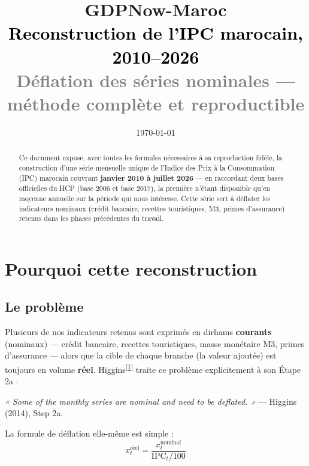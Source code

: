 \documentclass[11pt,a4paper]{article}
\title{\vspace{-1.3cm}\textcolor{bleuprincip}{\Huge\bfseries GDPNow-Maroc}\\[0.3cm]
\textcolor{black}{\Large Reconstruction de l'IPC marocain, 2010--2026}\\[0.15cm]
\textcolor{gray}{\large Déflation des séries nominales --- méthode complète et reproductible}}
\author{}
\date{\today}
\newcommand{\cit}[1]{\textsuperscript{\hyperlink{ref#1}{[#1]}}}
\begin{document}
\maketitle
\thispagestyle{empty}

\begin{abstract}
\noindent Ce document expose, avec toutes les formules nécessaires à sa reproduction fidèle, la construction d'une série mensuelle unique de l'Indice des Prix à la Consommation (IPC) marocain couvrant \textbf{janvier 2010 à juillet 2026} --- en raccordant deux bases officielles du HCP (base 2006 et base 2017), la première n'étant disponible qu'en moyenne annuelle sur la période qui nous intéresse. Cette série sert à déflater les indicateurs nominaux (crédit bancaire, recettes touristiques, M3, primes d'assurance) retenus dans les phases précédentes du travail.
\end{abstract}

\tableofcontents
\vspace{0.3cm}

\section{Pourquoi cette reconstruction}

\subsection{Le problème}

Plusieurs de nos indicateurs retenus sont exprimés en dirhams \textbf{courants} (nominaux) --- crédit bancaire, recettes touristiques, masse monétaire M3, primes d'assurance --- alors que la cible de chaque branche (la valeur ajoutée) est toujours en volume \textbf{réel}. Higgins\cit{1} traite ce problème explicitement à son Étape 2a :

\begin{noteboxbleu}
\textit{« Some of the monthly series are nominal and need to be deflated. »} --- Higgins (2014), Step 2a.
\end{noteboxbleu}

La formule de déflation elle-même est simple :
\begin{equation}
x_t^{\text{réel}} = \frac{x_t^{\text{nominal}}}{\text{IPC}_t / 100}
\label{eq:deflation}
\end{equation}
\end{document}

